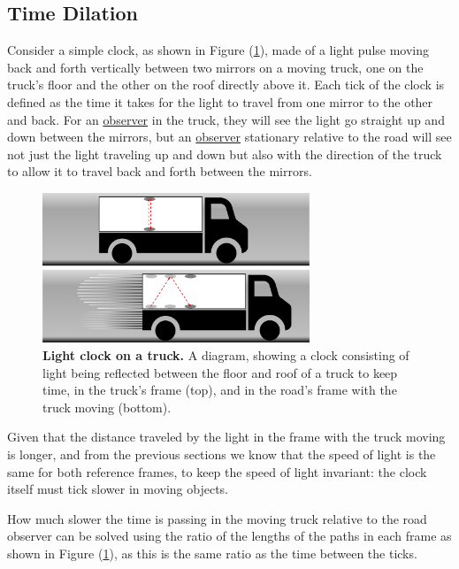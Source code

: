 \subsection{Time Dilation} \label{Subsect: Time Dilation}

Consider a simple clock, as shown in Figure (\ref{fig: truck clock}), made of a light pulse moving back and forth vertically between two mirrors on a moving truck, one on the truck's floor and the other on the roof directly above it.
Each tick of the clock is defined as the time it takes for the light to travel from one mirror to the other and back.
For an \hyperlink{def-observer}{observer} in the truck, they will see the light go straight up and down between the mirrors, but an \hyperlink{def-observer}{observer} stationary relative to the road will see not just the light traveling up and down but also with the direction of the truck to allow it to travel back and forth between the mirrors.

\begin{figure}[H]
	\centering
	\includegraphics[width = 8cm]{images/pdf/lorry_clock.pdf}
	\caption{\textbf{Light clock on a truck.} A diagram, showing a clock consisting of light being reflected between the floor and roof of a truck to keep time, in the truck's frame (top), and in the road's frame with the truck moving (bottom).}
	\label{fig: truck clock}
\end{figure}

Given that the distance traveled by the light in the frame with the truck moving is longer, and from the previous sections we know that the speed of light is the same for both reference frames, to keep the speed of light invariant: the clock itself must tick slower in moving objects.

How much slower the time is passing in the moving truck relative to the road observer can be solved using the ratio of the lengths of the paths in each frame as shown in Figure (\ref{fig: truck clock}), as this is the same ratio as the time between the ticks.

